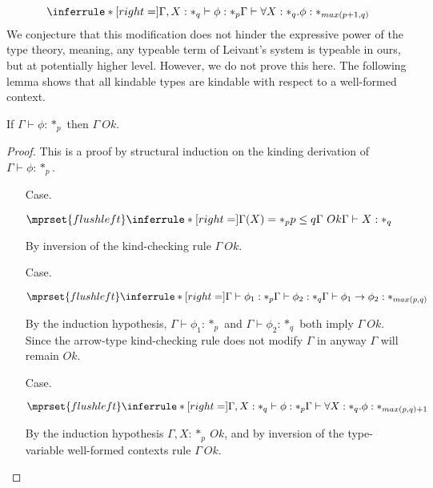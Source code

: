 \[
   \inferrule* [right=] {
     \Gamma,X : *_q \vdash \phi : *_p
   }{\Gamma \vdash \forall X:*_q.\phi : *_{max(p+1,q)}}
\]
We conjecture that this modification does not hinder the expressive
power of the type theory, meaning, any typeable term of Leivant's
system is typeable in ours, but at potentially higher level.  However,
we do not prove this here.  The following lemma shows that all
kindable types are kindable with respect to a well-formed context.
\begin{lemma}
  If $\Gamma \vdash \phi:*_p$ then $\Gamma\ Ok$.
  \label{lemma:kinding_ok_ssf}
\end{lemma}
\begin{proof}
  This is a proof by structural induction on the kinding derivation of $\Gamma \vdash \phi:*_p$.
  \begin{itemize}
  \item[Case.]\ \\
    \begin{center}
      \begin{math}
        $$\mprset{flushleft}
        \inferrule* [right=] {
          \Gamma(X) = *_p
          \\
          p \leq q
          \\
          \Gamma\ Ok
        }{\Gamma \vdash X : *_q}
      \end{math}
    \end{center}
    By inversion of the kind-checking rule $\Gamma\ Ok$.

  \item[Case.]\ \\
    \begin{center}
      \begin{math}
        $$\mprset{flushleft}
        \inferrule* [right=] {
          \Gamma \vdash \phi_1 : *_p
          \\
          \Gamma \vdash \phi_2 : *_q
        }{\Gamma \vdash \phi_1 \rightarrow \phi_2 : *_{max(p,q)}}
      \end{math}
    \end{center}
    By the induction hypothesis, $\Gamma \vdash \phi_1:*_p$ and
    $\Gamma \vdash \phi_2:*_q$ both imply $\Gamma\ Ok$.  Since the
    arrow-type kind-checking rule does not modify $\Gamma$ in anyway
    $\Gamma$ will remain $Ok$.

  \item[Case.]\ \\
    \begin{center}
      \begin{math}
        $$\mprset{flushleft}
        \inferrule* [right=] {
          \Gamma,X : *_q \vdash \phi : *_p
        }{\Gamma \vdash \forall X:*_q.\phi : *_{max(p,q)+1}}
      \end{math}
    \end{center}
    By the induction hypothesis $\Gamma,X:*_p\ Ok$, and by inversion of the type-variable
    well-formed contexts rule $\Gamma\ Ok$.
  \end{itemize}
\end{proof}
